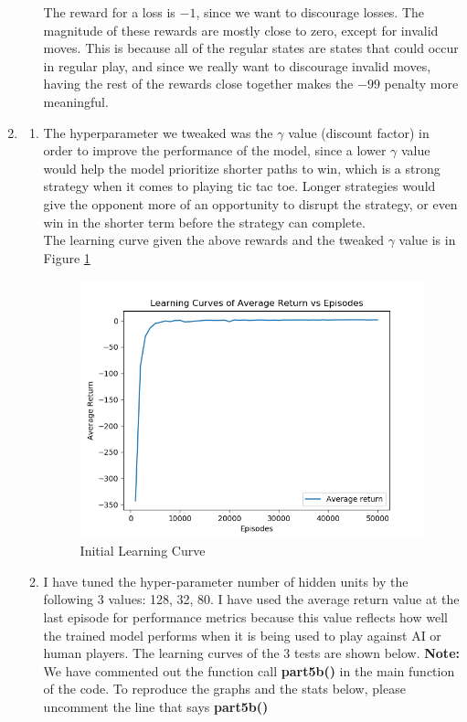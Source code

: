 \documentclass[10pt,letterpaper]{article}
\begin{document}
\begin{enumerate}
\begin{enumerate}
			The reward for a loss is $-1$, since we want to discourage losses.
			The magnitude of these rewards are mostly close to zero, except for invalid moves.
			This is because all of the regular states are states that could occur in regular play, and since we really want to discourage invalid moves, having the rest of the rewards close together makes the $-99$ penalty more meaningful.
		\end{enumerate}
		\item %
		\begin{enumerate}
			\item %
			The hyperparameter we tweaked was the  $\gamma$ value (discount factor) in order to improve the performance of the model, since a lower $\gamma$ value would help the model prioritize shorter paths to win, which is a strong strategy when it comes to playing tic tac toe.
			Longer strategies would give the opponent more of an opportunity to disrupt the strategy, or even win in the shorter term before the strategy can complete.
			\\
			The learning curve given the above rewards and the tweaked $\gamma$ value is in Figure \ref{fig:part5alearningcurve}
			\begin{figure}[H]
				\centering
				\includegraphics[width=0.7\linewidth]{Part5aLearningCurve}
				\caption{Initial Learning Curve}
				\label{fig:part5alearningcurve}
			\end{figure}

			\item %
			I have tuned the hyper-parameter number of hidden units by the following 3 values: 128, 32, 80. I have used the average return value at the last episode for performance metrics because this value reflects how well the trained model performs when it is being used to play against AI or human players. The learning curves of the 3 tests are shown below. \textbf{Note:} We have commented out the function call \textbf{part5b()} in the main function of the code. To reproduce the graphs and the stats below, please uncomment the line that says \textbf{part5b()}


\end{enumerate}
\end{enumerate}
\end{document}
